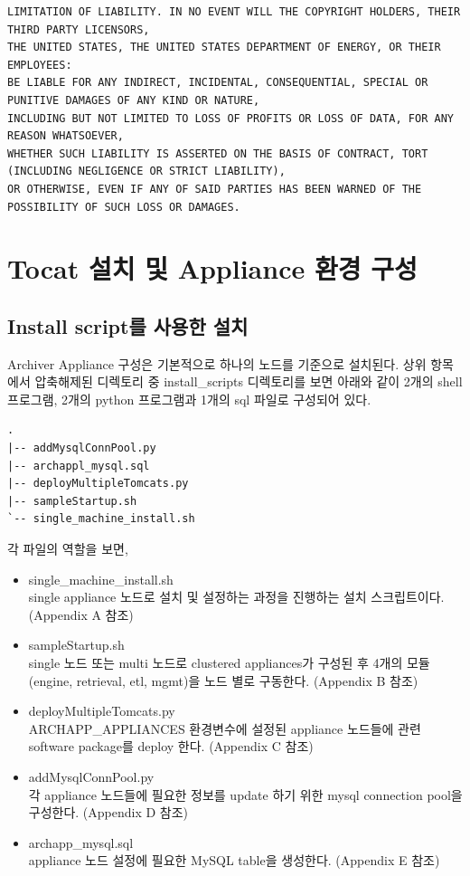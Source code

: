 \documentclass[11pt
  , a4paper
  , article
  , oneside
]{memoir}
\begin{document}
\begin{lstlisting}[style=termstyle]
LIMITATION OF LIABILITY. IN NO EVENT WILL THE COPYRIGHT HOLDERS, THEIR THIRD PARTY LICENSORS,
THE UNITED STATES, THE UNITED STATES DEPARTMENT OF ENERGY, OR THEIR EMPLOYEES:
BE LIABLE FOR ANY INDIRECT, INCIDENTAL, CONSEQUENTIAL, SPECIAL OR PUNITIVE DAMAGES OF ANY KIND OR NATURE,
INCLUDING BUT NOT LIMITED TO LOSS OF PROFITS OR LOSS OF DATA, FOR ANY REASON WHATSOEVER,
WHETHER SUCH LIABILITY IS ASSERTED ON THE BASIS OF CONTRACT, TORT (INCLUDING NEGLIGENCE OR STRICT LIABILITY),
OR OTHERWISE, EVEN IF ANY OF SAID PARTIES HAS BEEN WARNED OF THE POSSIBILITY OF SUCH LOSS OR DAMAGES.
\end{lstlisting}

\section{Tocat 설치 및 Appliance 환경 구성}
\subsection{Install script를 사용한 설치}
Archiver Appliance 구성은 기본적으로 하나의 노드를 기준으로 설치된다. 상위 항목에서 압축해제된 디렉토리 중 install\_scripts 디렉토리를 보면 아래와 같이 2개의 shell 프로그램, 2개의 python 프로그램과 1개의 sql 파일로 구성되어 있다.

\begin{lstlisting}[style=termstyle]
.
|-- addMysqlConnPool.py
|-- archappl_mysql.sql
|-- deployMultipleTomcats.py
|-- sampleStartup.sh
`-- single_machine_install.sh
\end{lstlisting}
각 파일의 역할을 보면,
\begin{itemize}
	\item single\_machine\_install.sh \\
	single appliance 노드로 설치 및 설정하는 과정을 진행하는 설치 스크립트이다. (Appendix A 참조)
	\item sampleStartup.sh \\
	single 노드 또는 multi 노드로 clustered appliances가 구성된 후 4개의 모듈(engine, retrieval, etl, mgmt)을 노드 별로 구동한다. (Appendix B 참조)
	\item deployMultipleTomcats.py \\
	ARCHAPP\_APPLIANCES 환경변수에 설정된 appliance 노드들에 관련 software package를 deploy 한다. (Appendix C 참조)
	\item addMysqlConnPool.py \\
	각 appliance 노드들에 필요한 정보를 update 하기 위한 mysql connection pool을 구성한다. (Appendix D 참조)
	\item archapp\_mysql.sql \\
	appliance 노드 설정에 필요한 MySQL table을 생성한다. (Appendix E 참조)
\end{itemize}
\end{document}
